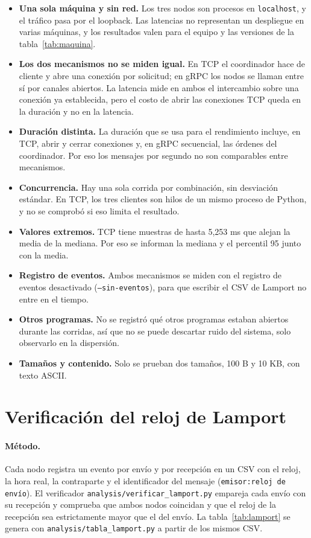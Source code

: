 \documentclass[11pt,a4paper]{article}
\begin{document}
\begin{itemize}
  \item \textbf{Una sola máquina y sin red.} Los tres nodos son procesos en
        \texttt{localhost}, y el tráfico pasa por el loopback. Las latencias no representan
        un despliegue en varias máquinas, y los resultados valen para el equipo y las
        versiones de la tabla~\ref{tab:maquina}.
  \item \textbf{Los dos mecanismos no se miden igual.} En TCP el coordinador hace de cliente
        y abre una conexión por solicitud; en gRPC los nodos se llaman entre sí por canales
        abiertos. La latencia mide en ambos el intercambio sobre una conexión ya
        establecida, pero el costo de abrir las conexiones TCP queda en la duración y no en
        la latencia.
  \item \textbf{Duración distinta.} La duración que se usa para el rendimiento incluye, en
        TCP, abrir y cerrar conexiones y, en gRPC secuencial, las órdenes del coordinador.
        Por eso los mensajes por segundo no son comparables entre mecanismos.
  \item \textbf{Concurrencia.} Hay una sola corrida por combinación, sin desviación estándar.
        En TCP, los tres clientes son hilos de un mismo proceso de Python, y no se comprobó
        si eso limita el resultado.
  \item \textbf{Valores extremos.} TCP tiene muestras de hasta 5,253 ms que alejan la media de
        la mediana. Por eso se informan la mediana y el percentil 95 junto con la media.
  \item \textbf{Registro de eventos.} Ambos mecanismos se miden con el registro de eventos
        desactivado (\texttt{--sin-eventos}), para que escribir el CSV de Lamport no entre en
        el tiempo.
  \item \textbf{Otros programas.} No se registró qué otros programas estaban abiertos durante
        las corridas, así que no se puede descartar ruido del sistema, solo observarlo en la
        dispersión.
  \item \textbf{Tamaños y contenido.} Solo se prueban dos tamaños, 100 B y 10 KB, con texto
        ASCII.
\end{itemize}

\section{Verificación del reloj de Lamport}

\paragraph{Método.} Cada nodo registra un evento por envío y por recepción en un CSV con
el reloj, la hora real, la contraparte y el identificador del mensaje (\texttt{emisor:reloj
de envío}). El verificador \texttt{analysis/verificar\_lamport.py} empareja cada envío con
su recepción y comprueba que ambos nodos coincidan y que el reloj de la recepción sea
estrictamente mayor que el del envío. La tabla~\ref{tab:lamport} se genera con
\texttt{analysis/tabla\_lamport.py} a partir de los mismos CSV.
\end{document}
